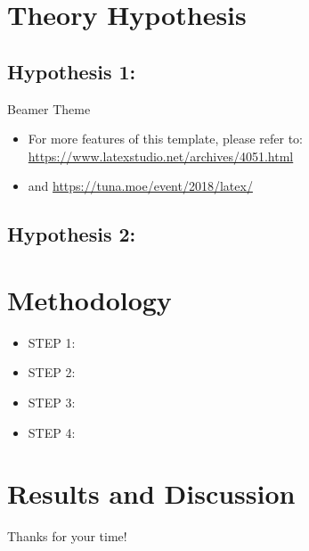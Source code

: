 \documentclass{beamer}
\begin{document}
\section{Theory Hypothesis}

\subsection{Hypothesis 1:}

\begin{frame}{Beamer Theme}
    \begin{itemize}
        \item For more features of this template, please refer to: \url{https://www.latexstudio.net/archives/4051.html}
        \item and \url{https://tuna.moe/event/2018/latex/}
    \end{itemize}
\end{frame}

\subsection{Hypothesis 2:}
\section{Methodology}
\begin{frame}
    \begin{itemize}
        \item STEP 1:
        \item STEP 2:
        \item STEP 3:
        \item STEP 4:
    \end{itemize}
\end{frame}

\section{Results and Discussion}

\begin{frame}[allowframebreaks]
    
    
\end{frame}

 
\begin{frame}
    \begin{center}
        {\Huge \textsf{Thanks for your time!} }
    \end{center}
\end{frame}
\end{document}
